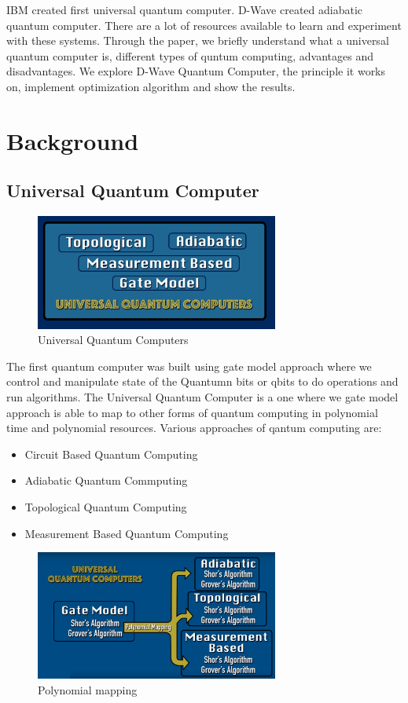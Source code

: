 \documentclass[12pt,conference]{IEEEtran}
\begin{document}
IBM created first universal quantum computer. D-Wave created adiabatic quantum computer. There are a lot of resources available to learn and experiment with these systems. Through the paper, we briefly understand what a universal quantum computer is, different types of quntum computing, advantages and disadvantages. We explore D-Wave Quantum Computer, the principle it works on, implement optimization algorithm and show the results. 


\section{Background}

\subsection{Universal Quantum Computer}

\begin{figure}[h]
  \centering
  \includegraphics[width=8cm]{uqc.png}
  \caption{Universal Quantum Computers}
  \label{fig:UniversalQC}
\end{figure}

The first quantum computer was built using gate model approach where we control and manipulate state of the Quantumn bits or qbits to do operations and run algorithms. The Universal Quantum Computer is a one where we gate model approach is able to map to other forms of quantum computing in polynomial time and polynomial resources. Various approaches of qantum computing are:
\begin{itemize}
  \item Circuit Based Quantum Computing
  \item Adiabatic Quantum Commputing
  \item Topological Quantum Computing
  \item Measurement Based Quantum Computing
\end{itemize}

\begin{figure}[h]
  \centering
  \includegraphics[width=8cm]{uqc_mapping.jpg}
  \caption{Polynomial mapping}
  \label{fig:PolynomicalUQC}
\end{figure}
\end{document}
